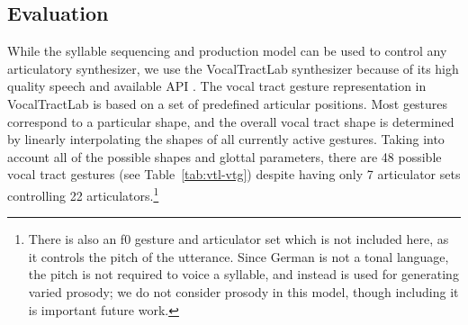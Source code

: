 \subsection{Evaluation}

While the syllable sequencing and production model
can be used to control any articulatory synthesizer,
we use the VocalTractLab synthesizer
because of its high quality speech
and available API \citep{birkholz2013}.
The vocal tract gesture representation
in VocalTractLab is based on a set of
predefined articular positions.
Most gestures correspond to
a particular shape,
and the overall vocal tract shape
is determined by linearly interpolating
the shapes of all currently active gestures.
Taking into account all of the
possible shapes and glottal parameters,
there are 48 possible vocal tract gestures
(see Table~\ref{tab:vtl-vtg}) despite having only
7 articulator sets
controlling 22 articulators.\footnote{
  There is also an f0 gesture and articulator set
  which is not included here,
  as it controls the pitch of the utterance.
  Since German is not a tonal language,
  the pitch is not required to voice a syllable,
  and instead is used for generating
  varied prosody;
  we do not consider prosody in this model,
  though including it is important future work.}

